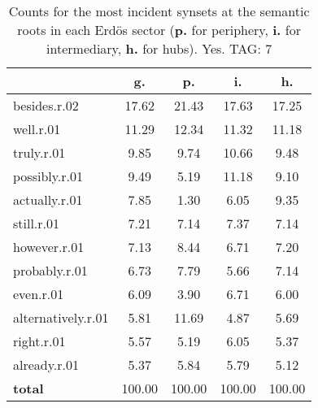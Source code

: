 \begin{table}[h!]
\begin{center}
\begin{tabular}{| l || c | c | c | c |}\hline
 & {\bf g.} & {\bf p.} & {\bf i.} & {\bf h.} \\\hline\hline
besides.r.02 & 17.62  & 21.43  & 17.63  & 17.25 \\\hline
well.r.01 & 11.29  & 12.34  & 11.32  & 11.18 \\\hline
truly.r.01 & 9.85  & 9.74  & 10.66  & 9.48 \\\hline
possibly.r.01 & 9.49  & 5.19  & 11.18  & 9.10 \\\hline
actually.r.01 & 7.85  & 1.30  & 6.05  & 9.35 \\\hline
still.r.01 & 7.21  & 7.14  & 7.37  & 7.14 \\\hline
however.r.01 & 7.13  & 8.44  & 6.71  & 7.20 \\\hline
probably.r.01 & 6.73  & 7.79  & 5.66  & 7.14 \\\hline
even.r.01 & 6.09  & 3.90  & 6.71  & 6.00 \\\hline
alternatively.r.01 & 5.81  & 11.69  & 4.87  & 5.69 \\\hline
right.r.01 & 5.57  & 5.19  & 6.05  & 5.37 \\\hline
already.r.01 & 5.37  & 5.84  & 5.79  & 5.12 \\\hline\hline
{{\bf total}} & 100.00  & 100.00  & 100.00  & 100.00 \\\hline
\end{tabular}
\caption{Counts for the most incident synsets at the semantic roots in each Erd\"os sector ({\bf p.} for periphery, {\bf i.} for intermediary, {\bf h.} for hubs). Yes. TAG: 7}
\end{center}
\end{table}